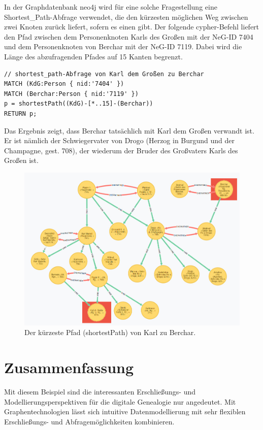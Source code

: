 \documentclass[ngerman,]{scrreprt}
\begin{document}
In der Graphdatenbank neo4j wird für eine solche Fragestellung eine Shortest\_Path-Abfrage verwendet, die den kürzesten möglichen Weg zwischen zwei Knoten zurück liefert, sofern es einen gibt. Der folgende cypher-Befehl liefert den Pfad zwischen dem Personenknoten Karls des Großen mit der NeG-ID 7404 und dem Personenknoten von Berchar mit der NeG-ID 7119. Dabei wird die Länge des abzufragenden Pfades auf 15 Kanten begrenzt.

\begin{verbatim}
// shortest_path-Abfrage von Karl dem Großen zu Berchar
MATCH (KdG:Person { nid:'7404' })
MATCH (Berchar:Person { nid:'7119' })
p = shortestPath((KdG)-[*..15]-(Berchar))
RETURN p;
\end{verbatim}

Das Ergebnis zeigt, dass Berchar tatsächlich mit Karl dem Großen verwandt ist. Er ist nämlich der Schwiegervater von Drogo (Herzog in Burgund und der Champagne, gest. 708), der wiederum der Bruder des Großvaters Karls des Großen ist.

\begin{figure}
\centering
\includegraphics{Bilder/NeG/050-Berchar-Karl-shortestpath.jpg}
\caption{Der kürzeste Pfad (shortestPath) von Karl zu Berchar.}
\end{figure}

\section{Zusammenfassung}\label{zusammenfassung-2}

Mit diesem Beispiel sind die interessanten Erschließungs- und Modellierungsperspektiven für die digitale Genealogie nur angedeutet. Mit Graphentechnologien lässt sich intuitive Datenmodellierung mit sehr flexiblen Erschließungs- und Abfragemöglichkeiten kombinieren.
\end{document}
